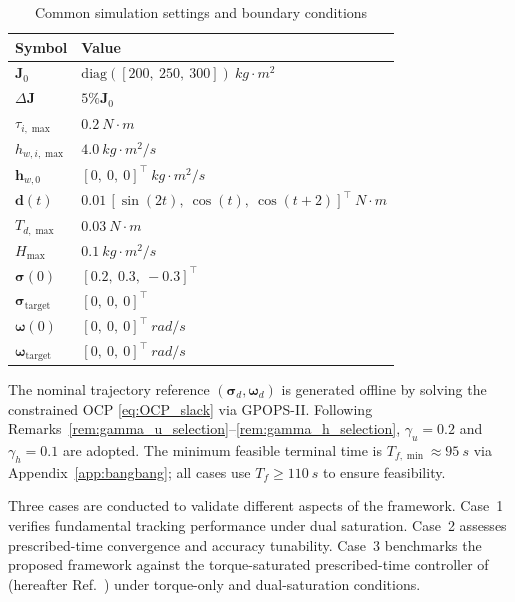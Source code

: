\documentclass[journal]{new-aiaa}
\begin{document}
\begin{table}[ht]
\centering
\caption{Common simulation settings and boundary conditions}
\label{tab:sim_setup_all}
\begin{tabular}{@{}l l@{}}
\toprule
\textbf{Symbol} & \textbf{Value} \\
\midrule
$\boldsymbol{J}_0$ &
$\mathrm{diag}([200,\ 250,\ 300])~\si{kg\cdot m^2}$ \\
$\Delta\boldsymbol{J}$ &
$5\% \boldsymbol{J}_0 $ \\
$\tau_{i,\max}$ &
$\SI{0.2}{N\cdot m}$ \\
$h_{w,i,\max}$ &
$\SI{4.0}{kg\cdot m^2/s}$ \\
$\boldsymbol{h}_{w,0}$ &
$[0,\ 0,\ 0]^\top~\si{kg\cdot m^2/s}$ \\
$\boldsymbol{d}(t)$ &
$0.01\,[\sin(2t),\ \cos(t),\ \cos(t+2)]^\top~\si{N\cdot m}$ \\
$T_{d,\max}$ &
$\SI{0.03}{N\cdot m}$ \\
$H_{\max}$ &
$\SI{0.1}{kg\cdot m^2/s}$ \\
$\boldsymbol{\sigma}(0)$ &
$[0.2,\ 0.3,\ -0.3]^\top$ \\
$\boldsymbol{\sigma}_{\mathrm{target}}$ &
$[0,\ 0,\ 0]^\top$ \\
$\boldsymbol{\omega}(0)$ &
$[0,\ 0,\ 0]^\top~\si{rad/s}$ \\
$\boldsymbol{\omega}_{\mathrm{target}}$ &
$[0,\ 0,\ 0]^\top~\si{rad/s}$ \\\bottomrule
\end{tabular}
\end{table}

The nominal trajectory reference $(\boldsymbol{\sigma}_d,\boldsymbol{\omega}_d)$ is generated offline by solving the constrained OCP
\eqref{eq:OCP_slack} via GPOPS-II.
Following Remarks~\ref{rem:gamma_u_selection}--\ref{rem:gamma_h_selection},
$\gamma_u=0.2$ and $\gamma_h=0.1$ are adopted.
The minimum feasible terminal time is $T_{f,\min}\approx\SI{95}{s}$ via Appendix~\ref{app:bangbang};
all cases use $T_f\ge\SI{110}{s}$ to ensure feasibility.

Three cases are conducted to validate different aspects of the framework.
Case~1 verifies fundamental tracking performance under dual saturation.
Case~2 assesses prescribed-time convergence and accuracy tunability.
Case~3 benchmarks the proposed framework against the torque-saturated prescribed-time controller of~\cite{xu_distributed_2022} (hereafter Ref.~\cite{xu_distributed_2022}) under torque-only and dual-saturation conditions.
\end{document}

